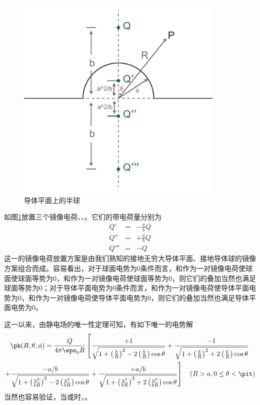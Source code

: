
    \begin{figure}[htbp]
        \centering
        \includegraphics[width=10cm]{img/2.1/电像法1.pdf}
        \caption{导体平面上的半球}
        \label{2.1_fig:电像法1}
    \end{figure}
    
    如图\ref{2.1_fig:电像法1}放置三个镜像电荷、、。它们的带电荷量分别为
    \begin{eqnarray}
        Q'   &=& -\frac{a}{b}Q \\
        Q''  &=& +\frac{a}{b}Q \\
        Q''' &=& -Q
    \end{eqnarray}
    这一的镜像电荷放置方案是由我们熟知的接地无穷大导体平面、接地导体球的镜像方案组合而成。容易看出，对于球面电势为0条件而言，和作为一对镜像电荷使球面使球面等势为0，和作为一对镜像电荷使球面等势为0，则它们的叠加当然也满足球面等势为0；对于导体平面电势为0条件而言，和作为一对镜像电荷使导体平面电势为0，和作为一对镜像电荷使导体平面电势为0，则它们的叠加当然也满足导体平面电势为0。
    
    这一以来，由静电场的唯一性定理可知，有如下唯一的电势解
    \begin{multline}
        \ph(R,\theta,\phi) = \frac{Q}{4\pi\eps_0 R}
        \left[
            \frac{+1}{\sqrt{1+\left(\frac{b}{R}\right)^2-2\left(\frac{b}{R}\right)\c}}
            +\frac{-1}{\sqrt{1+\left(\frac{b}{R}\right)^2+2\left(\frac{b}{R}\right)\c}}
            \right.
            \\
            \left.
            +\frac{-a/b}{\sqrt{1+\left(\frac{a^2}{bR}\right)^2-2\left(\frac{a^2}{bR}\right)\c}}
            +\frac{+a/b}{\sqrt{1+\left(\frac{a^2}{bR}\right)^2+2\left(\frac{a^2}{bR}\right)\c}}
        \right]
        \quad(R>a,0\le\theta<\pit)
    \end{multline}
    当然也容易验证，当或\nota{\theta=\pit}时，。
    
